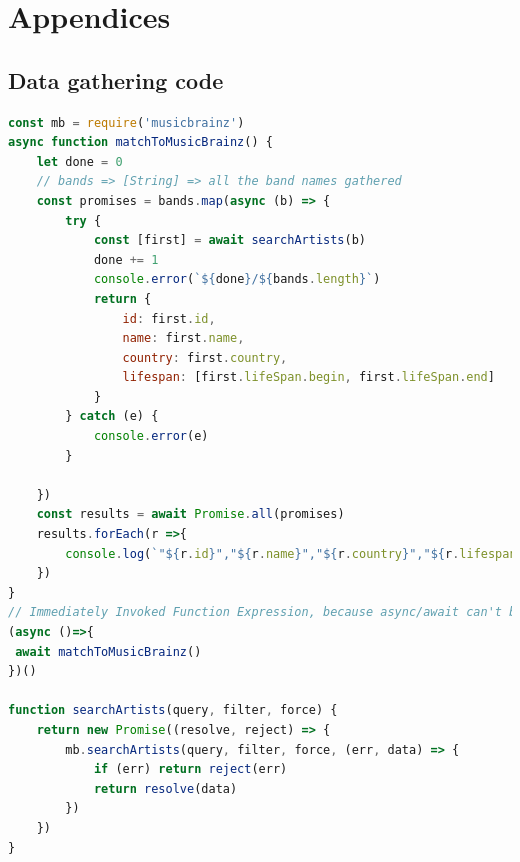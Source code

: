 \documentclass[10pt, a4paper]{article}
\begin{document}



\section{Appendices}
	\subsection{Data gathering code}

\begin{lstlisting}[language=JavaScript, label=lst:artistLookup, caption = Artist name to MusicBrainzID lookup ]
const mb = require('musicbrainz')
async function matchToMusicBrainz() {
    let done = 0
    // bands => [String] => all the band names gathered
    const promises = bands.map(async (b) => {
        try {
            const [first] = await searchArtists(b)
            done += 1
            console.error(`${done}/${bands.length}`)
            return {
                id: first.id,
                name: first.name,
                country: first.country,
                lifespan: [first.lifeSpan.begin, first.lifeSpan.end]
            }
        } catch (e) {
            console.error(e)
        }

    })
    const results = await Promise.all(promises)
    results.forEach(r =>{
        console.log(`"${r.id}","${r.name}","${r.country}","${r.lifespan[0]} ${r.lifespan[1]}"`)
    })
}
// Immediately Invoked Function Expression, because async/await can't be used at top level
(async ()=>{
 await matchToMusicBrainz()
})()

function searchArtists(query, filter, force) {
    return new Promise((resolve, reject) => {
        mb.searchArtists(query, filter, force, (err, data) => {
            if (err) return reject(err)
            return resolve(data)
        })
    })
}
\end{lstlisting}
\end{document}
